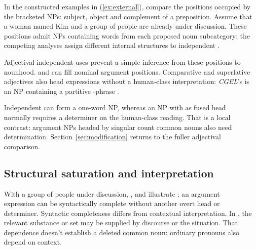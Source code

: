 \documentclass[12pt]{article}
\begin{document}
In the constructed examples in (\ref{ex:external}), compare the positions occupied by the bracketed NPs: subject, object and complement of a preposition. Assume that a woman named Kim and a group of people are already under discussion. These positions admit NPs containing words from each proposed noun subcategory; the competing analyses assign different internal structures to independent .

\begin{samepage}
\ea\label{ex:external}
\ea {}\qquad {}\qquad {}
\ex {}\qquad {}\qquad {}
\ex {}\qquad {}\qquad {}
\ex {}\qquad {}\qquad {}
\z\z
\end{samepage}

Adjectival independent uses prevent a simple inference from these positions to nounhood.  and  can fill nominal argument positions. Comparative and superlative adjectives also head expressions without a human-class interpretation: \textit{CGEL}'s  is an NP containing a partitive -phrase \citep[332--333, 416--423]{huddleston2002}.

Independent  can form a one-word NP, whereas an NP with  as fused head normally requires a determiner on the human-class reading. That is a local contrast: argument NPs headed by singular count common nouns also need determination. Section~\ref{sec:modification} returns to the fuller adjectival comparison.

\subsection{Structural saturation and interpretation}

With a group of people under discussion, ,  and  illustrate : an argument expression can be syntactically complete without another overt head or determiner. Syntactic completeness differs from contextual interpretation. In , the relevant substance or set may be supplied by discourse or the situation. That dependence doesn't establish a deleted common noun: ordinary pronouns also depend on context.
\end{document}
